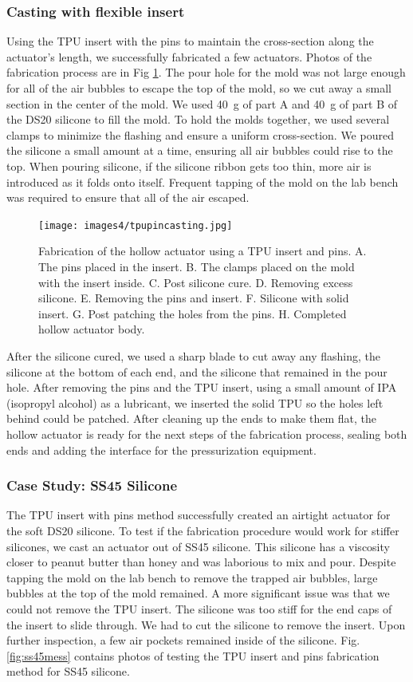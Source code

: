 \subsubsection{Casting with flexible insert}
Using the TPU insert with the pins to maintain the cross-section along the actuator's length, we successfully fabricated a few actuators. Photos of the fabrication process are in Fig \ref{fig:tpupinfab}. The pour hole for the mold was not large enough for all of the air bubbles to escape the top of the mold, so we cut away a small section in the center of the mold. We used 40~g of part A and 40~g of part B of the DS20 silicone to fill the mold. To hold the molds together, we used several clamps to minimize the flashing and ensure a uniform cross-section. We poured the silicone a small amount at a time, ensuring all air bubbles could rise to the top. When pouring silicone, if the silicone ribbon gets too thin, more air is introduced as it folds onto itself. Frequent tapping of the mold on the lab bench was required to ensure that all of the air escaped. 

\begin{figure}[ht]
    \centering
    \texttt{[image: images4/tpupincasting.jpg]}
    \caption{Fabrication of the hollow actuator using a TPU insert and pins. A. The pins placed in the insert. B. The clamps placed on the mold with the insert inside. C. Post silicone cure. D. Removing excess silicone. E. Removing the pins and insert. F. Silicone with solid insert. G. Post patching the holes from the pins. H. Completed hollow actuator body.}
    \label{fig:tpupinfab}
\end{figure}

After the silicone cured, we used a sharp blade to cut away any flashing, the silicone at the bottom of each end, and the silicone that remained in the pour hole. After removing the pins and the TPU insert, using a small amount of IPA (isopropyl alcohol) as a lubricant, we inserted the solid TPU so the holes left behind could be patched. After cleaning up the ends to make them flat, the hollow actuator is ready for the next steps of the fabrication process, sealing both ends and adding the interface for the pressurization equipment. 

\clearpage
\subsubsection{Case Study: SS45 Silicone}
The TPU insert with pins method successfully created an airtight actuator for the soft DS20 silicone. To test if the fabrication procedure would work for stiffer silicones, we cast an actuator out of SS45 silicone. This silicone has a viscosity closer to peanut butter than honey and was laborious to mix and pour. Despite tapping the mold on the lab bench to remove the trapped air bubbles, large bubbles at the top of the mold remained. A more significant issue was that we could not remove the TPU insert. The silicone was too stiff for the end caps of the insert to slide through. We had to cut the silicone to remove the insert. Upon further inspection, a few air pockets remained inside of the silicone. Fig. \ref{fig:ss45mess} contains photos of testing the TPU insert and pins fabrication method for SS45 silicone. 

